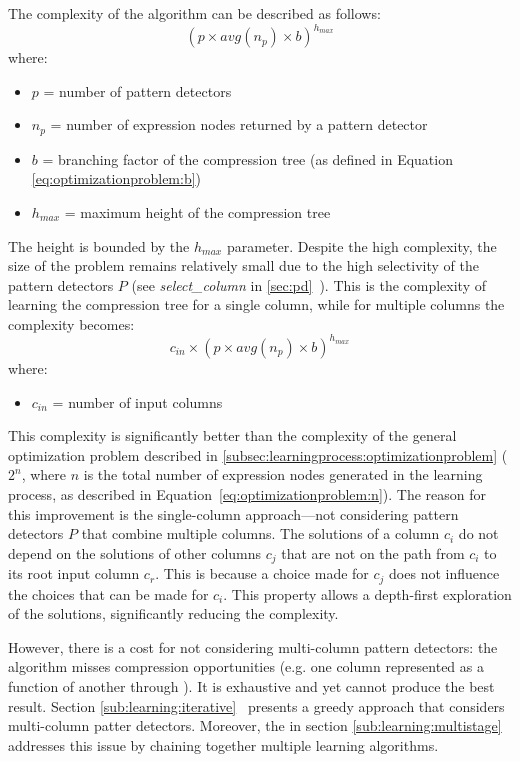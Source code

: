 The complexity of the algorithm can be described as follows:
\begin{equation}
\label{eq:learning:recursiveexhaustive:single}
    (p \times \mathit{avg}(n_{p}) \times b) ^ {h_{max}}
\end{equation}
where:
\begin{itemize}
    \item[] \(p\) = number of pattern detectors
    \item[] \(n_{p}\) = number of expression nodes returned by a pattern detector
    \item[] \(b\) = branching factor of the compression tree (as defined in Equation \ref{eq:optimizationproblem:b})
    \item[] \(h_{max}\) = maximum height of the compression tree
\end{itemize}
The height is bounded by the \(h_{max}\) parameter. Despite the high complexity, the size of the problem remains relatively small due to the high selectivity of the pattern detectors \(P\) (see \textit{select\_column} in \ref{sec:pd}~). This is the complexity of learning the compression tree for a single column, while for multiple columns the complexity becomes:
\begin{equation}
\label{eq:learning:recursiveexhaustive:multi}
    c_{in} \times (p \times \mathit{avg}(n_{p}) \times b) ^ {h_{max}}
\end{equation}
where:
\begin{itemize}
    \item[] \(c_{in}\) = number of input columns
\end{itemize}

This complexity is significantly better than the complexity of the general optimization problem described in \ref{subsec:learningprocess:optimizationproblem} (\(2^n\), where \(n\) is the total number of expression nodes generated in the learning process, as described in Equation~\ref{eq:optimizationproblem:n}). The reason for this improvement is the single-column approach---not considering pattern detectors \(P\) that combine multiple columns. The solutions of a column \(c_{i}\) do not depend on the solutions of other columns \(c_{j}\) that are not on the path from \(c_{i}\) to its root input column \(c_{r}\). This is because a choice made for \(c_{j}\) does not influence the choices that can be made for \(c_{i}\).
This property allows a depth-first exploration of the solutions, significantly reducing the complexity.

However, there is a cost for not considering multi-column pattern detectors: the algorithm misses compression opportunities (e.g. one column represented as a function of another through ). It is exhaustive and yet cannot produce the best result. Section \ref{sub:learning:iterative}~ presents a greedy approach that considers multi-column patter detectors. Moreover, the  in section \ref{sub:learning:multistage} addresses this issue by chaining together multiple learning algorithms.


